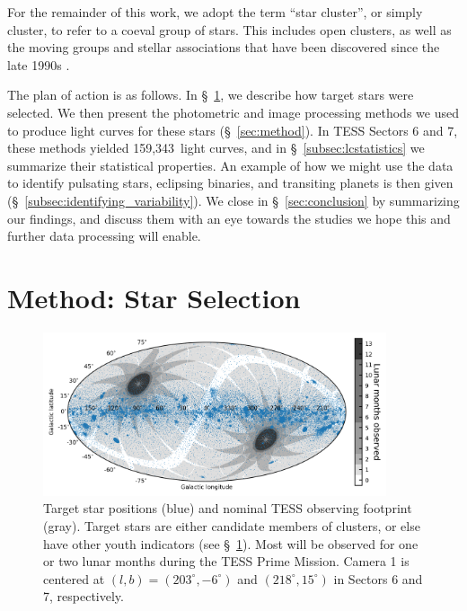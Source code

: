 \documentclass[12pt,twocolumn,tighten]{aastex62}
\newcommand{\numberlcs}{159{,}343\ } %
\begin{document}
For the remainder of this work, we adopt the term ``star cluster'', or
simply cluster, to refer to a coeval group of stars.  This includes
open clusters, as well as the moving groups and stellar associations
that have been discovered since the late 1990s
\citep{zuckerman_young_2004}. 

The plan of action is as follows. In \S~\ref{sec:starselection}, we
describe how target stars were selected. We then present the
photometric and image processing methods we used to produce light
curves for these stars (\S~\ref{sec:method}).  In TESS Sectors 6 and
7, these methods yielded \numberlcs light curves, and in
\S~\ref{subsec:lcstatistics} we summarize their statistical
properties.  An example of how we might use the data to identify
pulsating stars, eclipsing binaries, and transiting planets is then
given (\S~\ref{subsec:identifying_variability}).  We close in
\S~\ref{sec:conclusion} by summarizing our findings, and discuss them
with an eye towards the studies we hope this and further data
processing will enable.


\section{Method: Star Selection}
\label{sec:starselection}

\begin{figure}[!t]
	\begin{center}
		\leavevmode
		\includegraphics[width=0.9\textwidth]{target_star_positions.png}
	\end{center}
	\vspace{-0.5cm}
	\caption{
    Target star positions (blue) and nominal TESS observing footprint
    (gray).  Target stars are either candidate members of clusters, or
    else have other youth indicators (see \S~\ref{sec:starselection}).
    Most will be observed for one or two lunar months during the TESS
    Prime Mission.  Camera 1 is centered at $(l,b)=(203^\circ,
    -6^\circ)$ and $(218^\circ,15^\circ)$ in Sectors 6 and 7,
    respectively.
    \label{fig:cdips_targets_positions}
	}
\end{figure}
\end{document}
